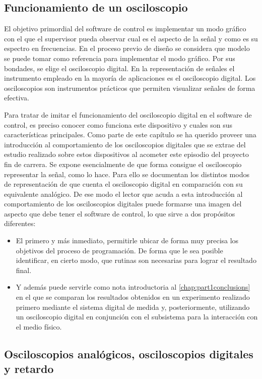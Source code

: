 \subsection{Funcionamiento de un osciloscopio}

El objetivo primordial del software de control es implementar un modo
gráfico con el que el supervisor pueda observar cual es el aspecto de la
señal y como es su espectro en frecuencias. En el proceso previo de diseño
se considera que modelo se puede tomar como referencia para implementar el
modo gráfico. Por sus bondades, se elige el osciloscopio digital. En la
representación de señales el instrumento empleado en la mayoría de
aplicaciones es el osciloscopio digital. Los osciloscopios son instrumentos
prácticos que permiten visualizar señales de forma efectiva.

Para tratar de imitar el funcionamiento del osciloscopio digital en el
software de control, es preciso conocer como funciona este dispositivo y
cuales son sus características principales. Como parte de este capítulo se
ha querido proveer una introducción al comportamiento de los osciloscopios
digitales que se extrae del estudio realizado sobre estos dispositivos al
acometer este episodio del proyecto fin de carrera. Se expone esencialmente
de que forma consigue el osciloscopio representar la señal, como lo hace.
Para ello se documentan los distintos modos de representación de que cuenta
el osciloscopio digital en comparación con su equivalente analógico. De ese
modo el lector que acuda a esta introducción al comportamiento de los
osciloscopios digitales puede formarse una imagen del aspecto que debe
tener el software de control, lo que sirve a dos propósitos diferentes:

\begin{itemize}
	\item El primero y más inmediato, permitirle ubicar de forma muy
		precisa los objetivos del proceso de programación. De forma
		que le sea posible identificar, en cierto modo, que rutinas
		son necesarias para lograr el resultado final.
	\item Y además puede servirle como nota introductoria al
		\cref{chap:part1conclusions} en el que se comparan los
		resultados obtenidos en un experimento realizado primero
		mediante el sistema digital de medida y, posteriormente,
		utilizando un osciloscopio digital en conjunción con el
		subsistema para la interacción con el medio físico.
\end{itemize}


\subsection{Osciloscopios analógicos, osciloscopios digitales y retardo}

